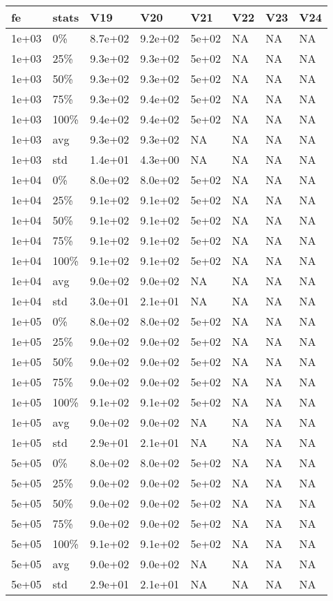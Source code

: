 \documentclass[11pt]{article}
\begin{document}
\begin{longtable}{llllllll}
  \hline
fe & stats & V19 & V20 & V21 & V22 & V23 & V24 \\ 
  \hline
1e+03 & 0\% & 8.7e+02 & 9.2e+02 & 5e+02 & NA & NA & NA \\ 
  1e+03 & 25\% & 9.3e+02 & 9.3e+02 & 5e+02 & NA & NA & NA \\ 
  1e+03 & 50\% & 9.3e+02 & 9.3e+02 & 5e+02 & NA & NA & NA \\ 
  1e+03 & 75\% & 9.3e+02 & 9.4e+02 & 5e+02 & NA & NA & NA \\ 
  1e+03 & 100\% & 9.4e+02 & 9.4e+02 & 5e+02 & NA & NA & NA \\ 
  1e+03 & avg & 9.3e+02 & 9.3e+02 &    NA & NA & NA & NA \\ 
  1e+03 & std & 1.4e+01 & 4.3e+00 &    NA & NA & NA & NA \\ 
  1e+04 & 0\% & 8.0e+02 & 8.0e+02 & 5e+02 & NA & NA & NA \\ 
  1e+04 & 25\% & 9.1e+02 & 9.1e+02 & 5e+02 & NA & NA & NA \\ 
  1e+04 & 50\% & 9.1e+02 & 9.1e+02 & 5e+02 & NA & NA & NA \\ 
  1e+04 & 75\% & 9.1e+02 & 9.1e+02 & 5e+02 & NA & NA & NA \\ 
  1e+04 & 100\% & 9.1e+02 & 9.1e+02 & 5e+02 & NA & NA & NA \\ 
  1e+04 & avg & 9.0e+02 & 9.0e+02 &    NA & NA & NA & NA \\ 
  1e+04 & std & 3.0e+01 & 2.1e+01 &    NA & NA & NA & NA \\ 
  1e+05 & 0\% & 8.0e+02 & 8.0e+02 & 5e+02 & NA & NA & NA \\ 
  1e+05 & 25\% & 9.0e+02 & 9.0e+02 & 5e+02 & NA & NA & NA \\ 
  1e+05 & 50\% & 9.0e+02 & 9.0e+02 & 5e+02 & NA & NA & NA \\ 
  1e+05 & 75\% & 9.0e+02 & 9.0e+02 & 5e+02 & NA & NA & NA \\ 
  1e+05 & 100\% & 9.1e+02 & 9.1e+02 & 5e+02 & NA & NA & NA \\ 
  1e+05 & avg & 9.0e+02 & 9.0e+02 &    NA & NA & NA & NA \\ 
  1e+05 & std & 2.9e+01 & 2.1e+01 &    NA & NA & NA & NA \\ 
  5e+05 & 0\% & 8.0e+02 & 8.0e+02 & 5e+02 & NA & NA & NA \\ 
  5e+05 & 25\% & 9.0e+02 & 9.0e+02 & 5e+02 & NA & NA & NA \\ 
  5e+05 & 50\% & 9.0e+02 & 9.0e+02 & 5e+02 & NA & NA & NA \\ 
  5e+05 & 75\% & 9.0e+02 & 9.0e+02 & 5e+02 & NA & NA & NA \\ 
  5e+05 & 100\% & 9.1e+02 & 9.1e+02 & 5e+02 & NA & NA & NA \\ 
  5e+05 & avg & 9.0e+02 & 9.0e+02 &    NA & NA & NA & NA \\ 
  5e+05 & std & 2.9e+01 & 2.1e+01 &    NA & NA & NA & NA \\ 
   \hline
\hline
\end{longtable}
\newpage
\end{document}
